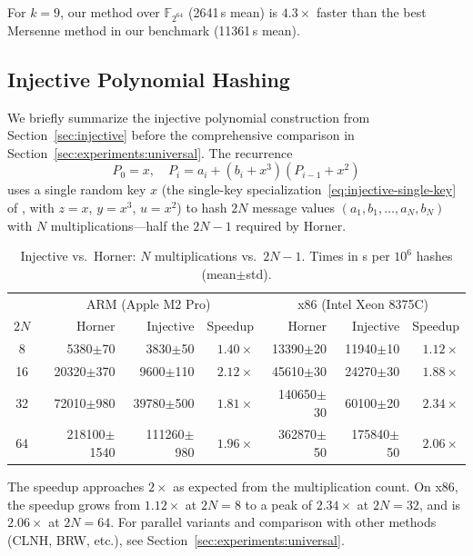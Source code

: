For $k=9$, our method over $\mathbb{F}_{2^{64}}$ (2641\,\textmu s mean) is
$4.3\times$ faster than the best Mersenne method in our benchmark (11361\,\textmu s mean).

\subsection{Injective Polynomial Hashing}
\label{sec:experiments:injective}

We briefly summarize the injective polynomial construction from Section~\ref{sec:injective}
before the comprehensive comparison in Section~\ref{sec:experiments:universal}.
The recurrence
\[
    P_0 = x, \quad P_i = a_i + (b_i + x^3)(P_{i-1} + x^2)
\]
uses a single random key $x$ (the single-key specialization~\eqref{eq:injective-single-key} of , with $z=x$, $y=x^3$, $u=x^2$) to hash $2N$ message values $(a_1, b_1, \ldots, a_N, b_N)$
with $N$ multiplications---half the $2N-1$ required by Horner.

\begin{table}[!htbp]
\centering
\caption{Injective vs.\ Horner: $N$ multiplications vs.\ $2N-1$.
         Times in \textmu s per $10^6$ hashes (mean$\pm$std).}
\label{tab:injective}
\begin{tabular}{c|rrr|rrr}
    & \multicolumn{3}{c|}{ARM (Apple M2 Pro)} & \multicolumn{3}{c}{x86 (Intel Xeon 8375C)} \\
    $2N$ & Horner & Injective & Speedup & Horner & Injective & Speedup \\
    \hline
    8  & 5380$\pm$70 & 3830$\pm$50 & $1.40\times$ & 13390$\pm$20 & 11940$\pm$10 & $1.12\times$ \\
    16 & 20320$\pm$370 & 9600$\pm$110 & $2.12\times$ & 45610$\pm$30 & 24270$\pm$30 & $1.88\times$ \\
    32 & 72010$\pm$980 & 39780$\pm$500 & $1.81\times$ & 140650$\pm$30 & 60100$\pm$20 & $2.34\times$ \\
    64 & 218100$\pm$1540 & 111260$\pm$980 & $1.96\times$ & 362870$\pm$50 & 175840$\pm$50 & $2.06\times$ \\
\end{tabular}
\end{table}

The speedup approaches $2\times$ as expected from the multiplication count.
On x86, the speedup grows from $1.12\times$ at $2N=8$ to a peak of
$2.34\times$ at $2N=32$, and is $2.06\times$ at $2N=64$.
For parallel variants and comparison with other methods (CLNH, BRW, etc.),
see Section~\ref{sec:experiments:universal}.

